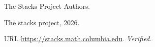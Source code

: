 {The Stacks Project Authors}.

\newblock The stacks project, 2026.

\newblock URL \url{https://stacks.math.columbia.edu}.
\newblock \emph{Verified}.

